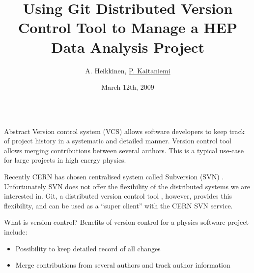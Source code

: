 \documentclass[final,hyperref={pdfpagelabels=false},notitlepage=true]{beamer}
\title[]{\Huge Using Git Distributed Version Control Tool to Manage a HEP Data Analysis Project}
\author{A. Heikkinen\inst{1}, \underline{P. Kaitaniemi\inst{1,2}}}
\institute[] %
{
  \inst{1}%
  Helsinki Institute of Physics P.O.Box 64 (Gustaf H\"allstr\"omin katu 2), FIN-00014 University of Helsinki, Finland
  \\
  \inst{2}%
  CEN-Saclay, CEA-IRFU/SPhN, 91 191 Gif sur Yvette, France
}
\date[March 12th, 2009]{March 12th, 2009}
\begin{document}
  \begin{frame}{} 
    \vfill
    \begin{columns}[t]
      \begin{column}{0.45\linewidth}

    \begin{block}{\large Abstract}
      \vskip1cm
Version control system (VCS) allows software developers to keep track of project history in
a {\color{orange} systematic} and {\color{orange} detailed} manner. 
Version control tool allows
merging contributions between several authors.
This is a typical use-case for large projects in high energy physics.


\vspace{1cm}

Recently {\color{orange} CERN has chosen centralised system called Subversion (SVN)} \cite{svnsite} \cite{cernsvn}.
Unfortunately SVN does not offer the flexibility of the
distributed systems we are interested in. 
Git, a distributed version control tool \cite{torvalds}, however, 
provides this flexibility, 
and can be used as a ``super client'' with the CERN SVN service.




\end{block}

    \vskip2cm
    \begin{block}{\large What is version control?}
      \vskip1cm
      Benefits of version control for a physics software project include:
      \begin{itemize}
        \item Possibility to keep detailed record of all changes
        \item Merge contributions from several authors and track author information
      \end{itemize}


\end{block}
\end{column}
\end{columns}
\end{frame}
\end{document}
